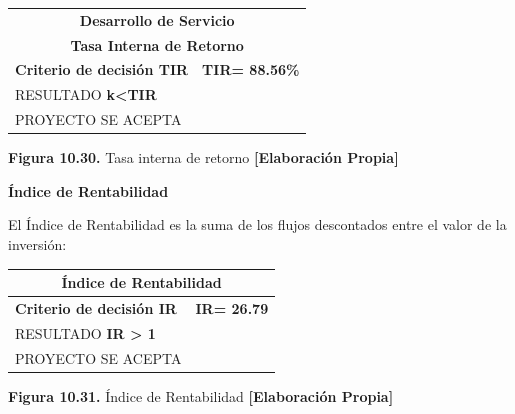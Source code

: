 \begin{table}[H]
\centering
\scriptsize
\renewcommand{\arraystretch}{1.2}
\setlength{\tabcolsep}{6pt}
\begin{tabular}{|p{8cm}|p{4cm}|}
\hline
\multicolumn{2}{|c|}{\textbf{Desarrollo de Servicio}} \\
\multicolumn{2}{|c|}{\textbf{Tasa Interna de Retorno}} \\ \hline
\textbf{Criterio de decisión TIR} & \textbf{TIR= \hfill 88.56\%} \\ \hline
RESULTADO \hfill \textbf{k<TIR} &  \\ \hline
PROYECTO SE ACEPTA &  \\ \hline
\end{tabular}

\vspace{0.2cm}
\textbf{Figura 10.30.} Tasa interna de retorno \textbf{[Elaboración Propia]}
\end{table}

\textbf{Índice de Rentabilidad}

El Índice de Rentabilidad es la suma de los flujos descontados entre el valor de la inversión:

\begin{table}[H]
\centering
\scriptsize
\renewcommand{\arraystretch}{1.2}
\setlength{\tabcolsep}{6pt}
\begin{tabular}{|p{8cm}|p{4cm}|}
\hline
\multicolumn{2}{|c|}{\textbf{Índice de Rentabilidad}} \\ \hline
\textbf{Criterio de decisión IR} & \textbf{IR= \hfill 26.79} \\ \hline
RESULTADO \hfill \textbf{IR > 1} &  \\ \hline
PROYECTO SE ACEPTA &  \\ \hline
\end{tabular}

\vspace{0.2cm}
\textbf{Figura 10.31.} Índice de Rentabilidad \textbf{[Elaboración Propia]}
\end{table}